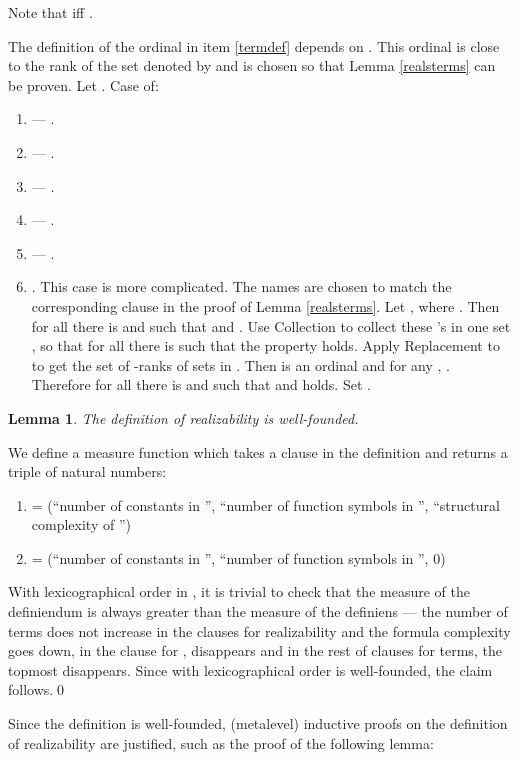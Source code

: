 \documentclass{LMCS}
\newtheorem{lemma}[thm]{Lemma}
\begin{document}
Note that  iff .

The definition of the ordinal  in item \ref{termdef} 
depends on . This ordinal is close to the rank of the set denoted
by  and is chosen so that Lemma \ref{realsterms} can be proven.
Let .
Case  of:
\begin{enumerate}[]
\item  --- . 
\item  --- . 
\item  --- .
\item  --- . 
\item  --- .
\item . This case is more complicated.
The names are chosen to match the corresponding clause in the proof of Lemma \ref{realsterms}. 
Let , where
. Then for all  there is  and  such that  and . Use Collection to collect these 's in one set , so that for
all  there is  such that the property holds. Apply Replacement
to  to get the set of -ranks of sets in . Then  is
an ordinal and for any , . Therefore for all  there is  and  such that  and  holds. Set .
\end{enumerate}

\begin{lemma}
The definition of realizability is well-founded. 
\end{lemma}
\proof We define a measure function  which takes a clause in the
definition and returns a triple of natural numbers:
\begin{enumerate}[]
\item  = (``number of constants  in '',
``number of function symbols in '', ``structural complexity of '')
\item  = (``number of constants  in '', ``number of function symbols in '', 0)
\end{enumerate}
With lexicographical order in , it is trivial to check that the measure
of the definiendum is always greater than the measure of the definiens ---
the number of terms does not increase in the clauses for realizability and
the formula complexity goes down, in the clause for ,  disappears and in the rest of clauses for terms,
the topmost  disappears. Since  with lexicographical order is
well-founded, the claim follows.\qed


Since the definition is well-founded, (metalevel) inductive proofs on the
definition of realizability are justified, such as the proof of the following lemma:
\end{document}
